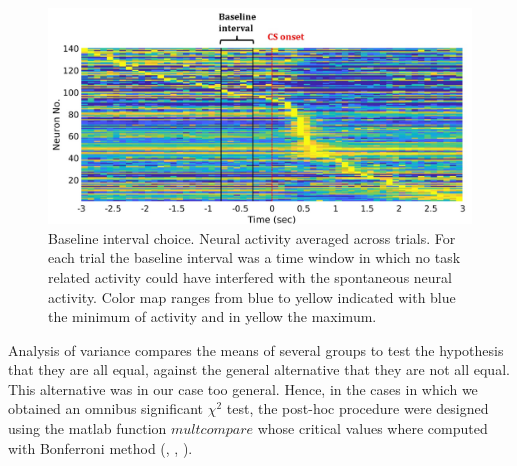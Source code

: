 \begin{figure}
    \centering
    \includegraphics[scale=0.6]{figures/Baseline.pdf}
    \caption{Baseline interval choice. Neural activity averaged across trials. For each trial the baseline interval was a time window in which no task related activity could have interfered with the spontaneous neural activity. Color map ranges from blue to yellow indicated with blue the minimum of activity and in yellow the maximum.}
    \label{fig:Baseline}
\end{figure}
Analysis of variance compares the means of several groups to test the hypothesis that they are all equal, against the general alternative that they are not all equal. This alternative was in our case too general. Hence, in the cases in which we obtained an omnibus significant $\chi^2$ test, the post-hoc procedure were designed using the matlab function $\textit{multcompare}$ whose critical values where computed with Bonferroni method (\cite{Bonferroni}, \cite{Dunn1958}, \cite{Dunn1961}).\\
